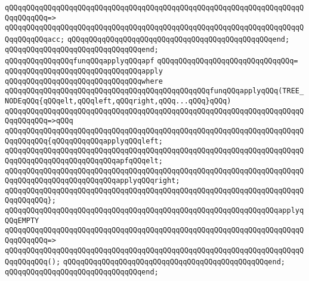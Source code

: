 \verb|qQQqqQQqqQQqqQQqqQQqqQQqqQQqqQQqqQQqqQQqqQQqqQQqqQQqqQQqqQQqqQQqqQQqqQQqqQQqqQQq=>|\newline
\verb|qQQqqQQqqQQqqQQqqQQqqQQqqQQqqQQqqQQqqQQqqQQqqQQqqQQqqQQqqQQqqQQqqQQqqQQqqQQqqQQqacc;|\newline
\verb|qQQqqQQqqQQqqQQqqQQqqQQqqQQqqQQqqQQqqQQqqQQqqQQqend;|\newline
\verb|qQQqqQQqqQQqqQQqqQQqqQQqqQQqqQQqend;|\newline
\newline
\newline
\verb|qQQqqQQqqQQqqQQqfunqQQqapplyqQQqapf|\newline
\verb|qQQqqQQqqQQqqQQqqQQqqQQqqQQqqQQq=|\newline
\verb|qQQqqQQqqQQqqQQqqQQqqQQqqQQqqQQqapply|\newline
\verb|qQQqqQQqqQQqqQQqqQQqqQQqqQQqqQQqwhere|\newline
\verb|qQQqqQQqqQQqqQQqqQQqqQQqqQQqqQQqqQQqqQQqqQQqqQQqfunqQQqapplyqQQq(TREE_NODEqQQq{qQQqelt,qQQqleft,qQQqright,qQQq...qQQq}qQQq)|\newline
\verb|qQQqqQQqqQQqqQQqqQQqqQQqqQQqqQQqqQQqqQQqqQQqqQQqqQQqqQQqqQQqqQQqqQQqqQQqqQQqqQQq=>qQQq|\newline
\verb|qQQqqQQqqQQqqQQqqQQqqQQqqQQqqQQqqQQqqQQqqQQqqQQqqQQqqQQqqQQqqQQqqQQqqQQqqQQqqQQq{qQQqqQQqqQQqapplyqQQqleft;|\newline
\verb|qQQqqQQqqQQqqQQqqQQqqQQqqQQqqQQqqQQqqQQqqQQqqQQqqQQqqQQqqQQqqQQqqQQqqQQqqQQqqQQqqQQqqQQqqQQqqQQqapfqQQqelt;|\newline
\verb|qQQqqQQqqQQqqQQqqQQqqQQqqQQqqQQqqQQqqQQqqQQqqQQqqQQqqQQqqQQqqQQqqQQqqQQqqQQqqQQqqQQqqQQqqQQqqQQqapplyqQQqright;|\newline
\verb|qQQqqQQqqQQqqQQqqQQqqQQqqQQqqQQqqQQqqQQqqQQqqQQqqQQqqQQqqQQqqQQqqQQqqQQqqQQqqQQq};|\newline
\newline
\verb|qQQqqQQqqQQqqQQqqQQqqQQqqQQqqQQqqQQqqQQqqQQqqQQqqQQqqQQqqQQqqQQqapplyqQQqEMPTY|\newline
\verb|qQQqqQQqqQQqqQQqqQQqqQQqqQQqqQQqqQQqqQQqqQQqqQQqqQQqqQQqqQQqqQQqqQQqqQQqqQQqqQQq=>|\newline
\verb|qQQqqQQqqQQqqQQqqQQqqQQqqQQqqQQqqQQqqQQqqQQqqQQqqQQqqQQqqQQqqQQqqQQqqQQqqQQqqQQq();|\newline
\verb|qQQqqQQqqQQqqQQqqQQqqQQqqQQqqQQqqQQqqQQqqQQqqQQqend;|\newline
\verb|qQQqqQQqqQQqqQQqqQQqqQQqqQQqqQQqend;|\newline
\newline
